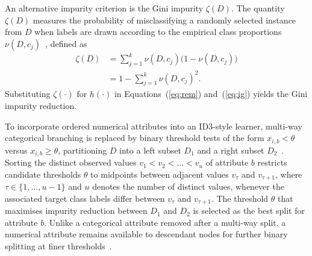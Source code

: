An alternative impurity criterion is the Gini impurity $\zeta(D)$. The quantity $\zeta(D)$ measures the probability of misclassifying a randomly selected instance from $D$ when labels are drawn according to the empirical class proportions $\nu(D, c_j)$~\cite{Kelleher2020}, defined as
\begin{equation}
\begin{aligned}
    \zeta(D) &= \sum_{j=1}^k \nu(D, c_j)\bigl(1 - \nu(D, c_j)\bigr) \\
    &= 1 - \sum_{j=1}^k \nu(D, c_j)^2.
\end{aligned}
\label{eq:gini}
\end{equation}
Substituting $\zeta(\cdot)$ for $h(\cdot)$ in Equations~(\ref{eq:rem}) and~(\ref{eq:ig}) yields the Gini impurity reduction.

To incorporate ordered numerical attributes into an ID3-style learner, multi-way categorical branching is replaced by binary threshold tests of the form $x_{i,b} < \theta$ versus $x_{i,b} \ge \theta$, partitioning $D$ into a left subset $D_1$ and a right subset $D_2$~\cite{Kelleher2020,Quinlan1993}. Sorting the distinct observed values $v_1 < v_2 < \dots < v_u$ of attribute $b$ restricts candidate thresholds $\theta$ to midpoints between adjacent values $v_\tau$ and $v_{\tau+1}$, where $\tau \in \{1, \dots, u-1\}$ and $u$ denotes the number of distinct values, whenever the associated target class labels differ between $v_\tau$ and $v_{\tau+1}$. The threshold $\theta$ that maximises impurity reduction between $D_1$ and $D_2$ is selected as the best split for attribute $b$. Unlike a categorical attribute removed after a multi-way split, a numerical attribute remains available to descendant nodes for further binary splitting at finer thresholds~\cite{Kelleher2020}.

